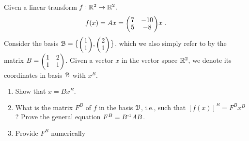 

\renewcommand{\course}{Maths for Intelligent Systems}
\renewcommand{\coursedate}{Summer 2019}

\renewcommand{\exnum}{Exercise 1}

\exercises

\exercisestitle











Given a linear transform $f: {\mathbb{R}}^2 \to {\mathbb{R}}^2,$
$$ f(x) = A x = \mat{cc}{7 & -10 \\ 5 & -8} x ~.$$ Consider the basis
$\BB = \big\{ \mat{c}{1\\1}, \mat{c}{2\\1} \big\}$, which we also
simply refer to by the matrix $B=\mat{cc}{1 & 2 \\ 1 & 1}$. Given a
vector $x$ in the vector space ${\mathbb{R}}^2$, we denote its coordinates in
basis ${\cal B}$ with $x^B$.

\begin{enumerate}
\item Show that $x = B x^B$.


\item What is the matrix $F^B$ of $f$ in the basis ${\cal B}$, i.e., such that $[f(x)]^B = F^B x^B$? Prove the general equation $F^B = B^{{\hspace*{-.0pt}\text{\rm -}\hspace*{-.5pt}}1} A B$.


\item Provide $F^B$ numerically
\end{enumerate}

